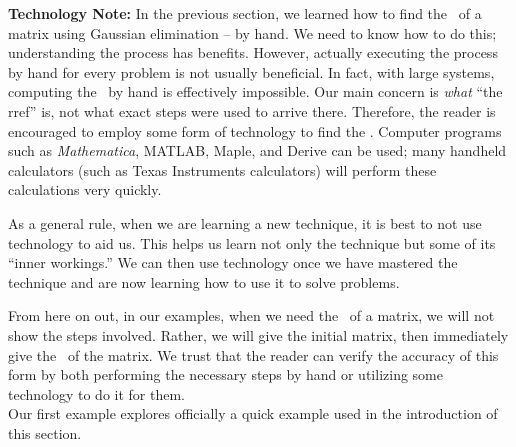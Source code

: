 \textsf{\textbf{ Technology Note:}} In the previous section, we learned how to find the \rref\ of a matrix using Gaussian elimination -- by hand. We need to know how to do this; understanding the process has benefits. However, actually executing the process by hand for every problem is not usually beneficial. In fact, with large systems, computing the \rref\ by hand is effectively impossible. Our main concern is \textit{what} ``the rref'' is, not what exact steps were used to arrive there.
Therefore, the reader is encouraged to employ some form of technology to find the \rref. Computer programs such as \textit{Mathematica}, MATLAB, Maple, and Derive can be used;
many handheld calculators (such as Texas Instruments calculators) will perform these calculations very quickly. 

As a general rule, when we are learning a new technique, it is best to not use technology to aid us. This helps us learn not only the technique but some of its ``inner workings.'' We can then use technology once we have mastered the technique and are now learning how to use it to solve problems.

From here on out, in our examples, when we need the \rref\ of a matrix, we will not show the steps involved. Rather, we will give the initial matrix, then immediately give the \rref\ of the matrix. We trust that the reader can verify the accuracy of this form by both performing the necessary steps by hand or utilizing some technology to do it for them.\\

Our first example explores officially a quick example used in the introduction of this section.\\

